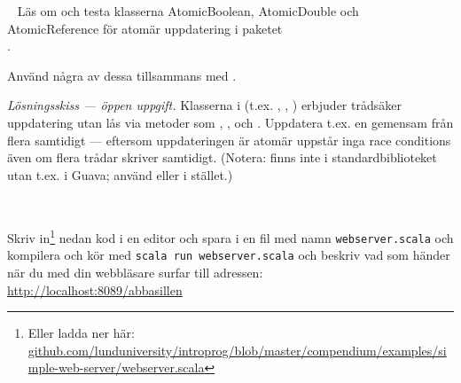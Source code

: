 \QUESTBEGIN

\Task  \what~ Läs om och testa klasserna AtomicBoolean, AtomicDouble och AtomicReference för atomär uppdatering i paketet \\ .

Använd några av dessa tillsammans med .


\SOLUTION

\TaskSolved \what
\emph{Lösningsskiss --- öppen uppgift.} Klasserna i  (t.ex. , , ) erbjuder trådsäker uppdatering utan lås via metoder som , ,  och . Uppdatera t.ex. en gemensam  från flera  samtidigt --- eftersom uppdateringen är atomär uppstår inga race conditions även om flera trådar skriver samtidigt. (Notera:  finns inte i standardbiblioteket utan t.ex. i Guava; använd  eller  i stället.)

\QUESTEND






\QUESTBEGIN

\Task  \what~

\Subtask Skriv in\footnote{Eller ladda ner här: \href{https://github.com/lunduniversity/introprog/blob/master/compendium/examples/simple-web-server/webserver.scala}{github.com/lunduniversity/introprog/blob/master/compendium/examples/simple-web-server/webserver.scala}} nedan kod i en editor och spara i en fil med namn \texttt{webserver.scala} och kompilera och kör med \texttt{scala run webserver.scala} och beskriv vad som händer när du med din webbläsare surfar till adressen: \\ \url{http://localhost:8089/abbasillen}


